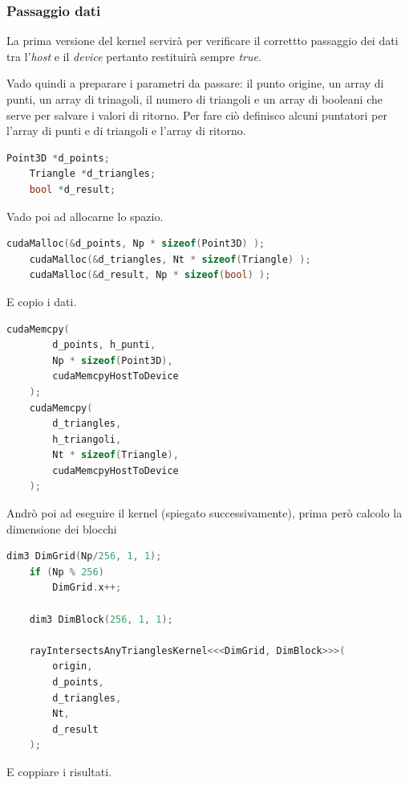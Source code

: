 \documentclass[a4paper]{article}
\begin{document}
\subsubsection{Passaggio dati}

La prima versione del kernel servirà per verificare il correttto passaggio dei dati tra l'\emph{host} e il \emph{device} pertanto restituirà sempre \emph{true}.

Vado quindi a preparare i parametri da passare: il punto origine, un array di punti, un array di trinagoli, il numero di triangoli e un array di booleani che serve per salvare i valori di ritorno. Per fare ciò definisco alcuni puntatori per l'array di punti e di triangoli e l'array di ritorno.

\begin{lstlisting}[language=c++]
    Point3D *d_points;
    Triangle *d_triangles;
    bool *d_result;
\end{lstlisting}

Vado poi ad allocarne lo spazio.

\begin{lstlisting}[language=c++]
    cudaMalloc(&d_points, Np * sizeof(Point3D) );
    cudaMalloc(&d_triangles, Nt * sizeof(Triangle) );
    cudaMalloc(&d_result, Np * sizeof(bool) );
\end{lstlisting}

E copio i dati.

\begin{lstlisting}[language=c++]
    cudaMemcpy( 
        d_points, h_punti, 
        Np * sizeof(Point3D), 
        cudaMemcpyHostToDevice
    );
    cudaMemcpy( 
        d_triangles, 
        h_triangoli, 
        Nt * sizeof(Triangle), 
        cudaMemcpyHostToDevice
    );
\end{lstlisting}

Andrò poi ad eseguire il kernel (spiegato successivamente), prima però calcolo la dimensione dei blocchi

\begin{lstlisting}[language=c++]
    dim3 DimGrid(Np/256, 1, 1);
    if (Np % 256)
        DimGrid.x++;

    dim3 DimBlock(256, 1, 1);

    rayIntersectsAnyTrianglesKernel<<<DimGrid, DimBlock>>>(
        origin, 
        d_points, 
        d_triangles, 
        Nt, 
        d_result
    );
\end{lstlisting}

E coppiare i risultati.
\end{document}
